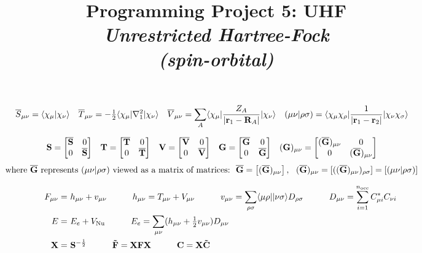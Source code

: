 \documentclass[fleqn]{article}
\title{Programming Project 5: UHF\\
\textit{Unrestricted Hartree-Fock\\(spin-orbital)}}
\author{}
\date{}
\begin{document}
\maketitle

\noindent
{}
\begin{align}
\label{space-ao-ints}
&
  \overline{S}_{\mu\nu}
=
  \langle\chi_{\mu}|\chi_{\nu}\rangle
&&
  \overline{T}_{\mu\nu}
=
  -\tfrac{1}{2}\langle\chi_{\mu}|\nabla_1^2|\chi_{\nu}\rangle
&&
  \overline{V}_{\mu\nu}
=
  \sum_A\langle\chi_{\mu}|\dfrac{Z_A}{|\mathbf{r}_1-\mathbf{R}_A|}|\chi_{\nu}\rangle
&&
  (\mu\nu|\rho\sigma)
=
  \langle\chi_\mu\chi_\rho|\dfrac{1}{|\mathbf{r}_1-\mathbf{r}_2|}|\chi_\nu\chi_\sigma\rangle
\end{align}


\noindent
{}
\begin{align}
\label{spin-ao-ints-1}
&
  \mathbf{S}
=
  \begin{bmatrix}\overline{\mathbf{S}}&0\\0&\overline{\mathbf{S}}\end{bmatrix}
&&
  \mathbf{T}
=
  \begin{bmatrix}\overline{\mathbf{T}}&0\\0&\overline{\mathbf{T}}\end{bmatrix}
&&
  \mathbf{V}
=
  \begin{bmatrix}\overline{\mathbf{V}}&0\\0&\overline{\mathbf{V}}\end{bmatrix}
&&
  \mathbf{G}
=
  \begin{bmatrix}\overline{\mathbf{G}}&0\\0&\overline{\mathbf{G}}\end{bmatrix}
&&
  (\mathbf{G})_{\mu\nu}
=
  \begin{bmatrix}(\overline{\mathbf{G}})_{\mu\nu}&0\\0&(\overline{\mathbf{G}})_{\mu\nu}\end{bmatrix}
\end{align}
\begin{align}
\label{spin-ao-ints-2}
&
\text{where $\ol{\bo{G}}$ represents $(\mu\nu|\rho\si)$ viewed as a matrix of matrices:}
\ \ 
  \ol{\bo{G}}
=
  \ma{(\ol{\bo{G}})_{\mu\nu}},
\ \ 
  (\ol{\bo{G}})_{\mu\nu}
=
  [((\ol{\bo{G}})_{\mu\nu})_{\rho\si}]
=
  [(\mu\nu|\rho\si)]
\end{align}


\noindent
{}
\begin{align}
\label{fock-matrix}
&&
  F_{\mu\nu}
=&\
  h_{\mu\nu}
+
  v_{\mu\nu}
\hspace{30pt}
  h_{\mu\nu}
=
  T_{\mu\nu}+V_{\mu\nu}
\hspace{30pt}
  v_{\mu\nu}
=
  \sum_{\rho\sigma}
  \langle\mu\rho||\nu\sigma\rangle
  D_{\rho\sigma}
\hspace{30pt}
  D_{\mu\nu}
=
  \sum_{i=1}^{n_\text{occ}}
  C_{\mu i}^* C_{\nu i}
\\
\label{energy}
&&
  E
=&\
  E_e
+
  V_\mathrm{Nu}
\hspace{30pt}
  E_e
=
  \sum_{\mu\nu}
  (h_{\mu\nu}+\tfrac{1}{2}v_{\mu\nu})D_{\mu\nu}
\\
\label{orthogonalizer}
&&
  \mathbf{X}
=&\
  \mathbf{S}^{-\frac{1}{2}}
\hspace{30pt}
  \mathbf{\tilde{F}}
=
  \mathbf{X}\mathbf{F}\mathbf{X}
\hspace{30pt}
  \mathbf{C}
=
  \mathbf{X}
  \mathbf{\tilde{C}}
\end{align}
\end{document}
